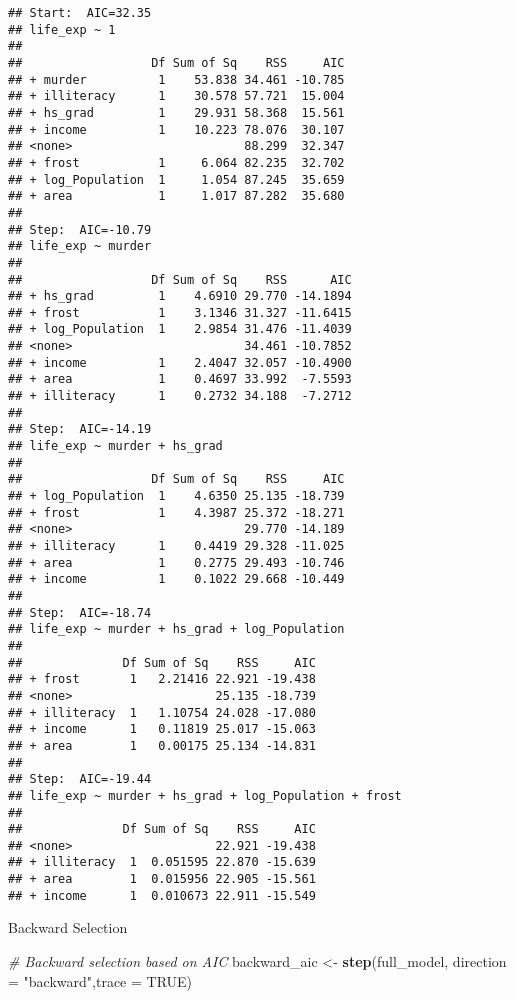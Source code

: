 \documentclass[
]{article}
\newenvironment{Shaded}{\begin{snugshade}}{\end{snugshade}}
\newcommand{\AttributeTok}[1]{\textcolor[rgb]{0.13,0.29,0.53}{#1}}
\newcommand{\CommentTok}[1]{\textcolor[rgb]{0.56,0.35,0.01}{\textit{#1}}}
\newcommand{\ConstantTok}[1]{\textcolor[rgb]{0.56,0.35,0.01}{#1}}
\newcommand{\FunctionTok}[1]{\textcolor[rgb]{0.13,0.29,0.53}{\textbf{#1}}}
\newcommand{\NormalTok}[1]{#1}
\newcommand{\OtherTok}[1]{\textcolor[rgb]{0.56,0.35,0.01}{#1}}
\newcommand{\StringTok}[1]{\textcolor[rgb]{0.31,0.60,0.02}{#1}}
\begin{document}
\begin{verbatim}
## Start:  AIC=32.35
## life_exp ~ 1
## 
##                  Df Sum of Sq    RSS     AIC
## + murder          1    53.838 34.461 -10.785
## + illiteracy      1    30.578 57.721  15.004
## + hs_grad         1    29.931 58.368  15.561
## + income          1    10.223 78.076  30.107
## <none>                        88.299  32.347
## + frost           1     6.064 82.235  32.702
## + log_Population  1     1.054 87.245  35.659
## + area            1     1.017 87.282  35.680
## 
## Step:  AIC=-10.79
## life_exp ~ murder
## 
##                  Df Sum of Sq    RSS      AIC
## + hs_grad         1    4.6910 29.770 -14.1894
## + frost           1    3.1346 31.327 -11.6415
## + log_Population  1    2.9854 31.476 -11.4039
## <none>                        34.461 -10.7852
## + income          1    2.4047 32.057 -10.4900
## + area            1    0.4697 33.992  -7.5593
## + illiteracy      1    0.2732 34.188  -7.2712
## 
## Step:  AIC=-14.19
## life_exp ~ murder + hs_grad
## 
##                  Df Sum of Sq    RSS     AIC
## + log_Population  1    4.6350 25.135 -18.739
## + frost           1    4.3987 25.372 -18.271
## <none>                        29.770 -14.189
## + illiteracy      1    0.4419 29.328 -11.025
## + area            1    0.2775 29.493 -10.746
## + income          1    0.1022 29.668 -10.449
## 
## Step:  AIC=-18.74
## life_exp ~ murder + hs_grad + log_Population
## 
##              Df Sum of Sq    RSS     AIC
## + frost       1   2.21416 22.921 -19.438
## <none>                    25.135 -18.739
## + illiteracy  1   1.10754 24.028 -17.080
## + income      1   0.11819 25.017 -15.063
## + area        1   0.00175 25.134 -14.831
## 
## Step:  AIC=-19.44
## life_exp ~ murder + hs_grad + log_Population + frost
## 
##              Df Sum of Sq    RSS     AIC
## <none>                    22.921 -19.438
## + illiteracy  1  0.051595 22.870 -15.639
## + area        1  0.015956 22.905 -15.561
## + income      1  0.010673 22.911 -15.549
\end{verbatim}

Backward Selection

\begin{Shaded}
\begin{Highlighting}[]
\CommentTok{\# Backward selection based on AIC}
\NormalTok{backward\_aic }\OtherTok{\textless{}{-}} \FunctionTok{step}\NormalTok{(full\_model, }
                     \AttributeTok{direction =} \StringTok{"backward"}\NormalTok{,}\AttributeTok{trace =} \ConstantTok{TRUE}\NormalTok{)}
\end{Highlighting}
\end{Shaded}
\end{document}
